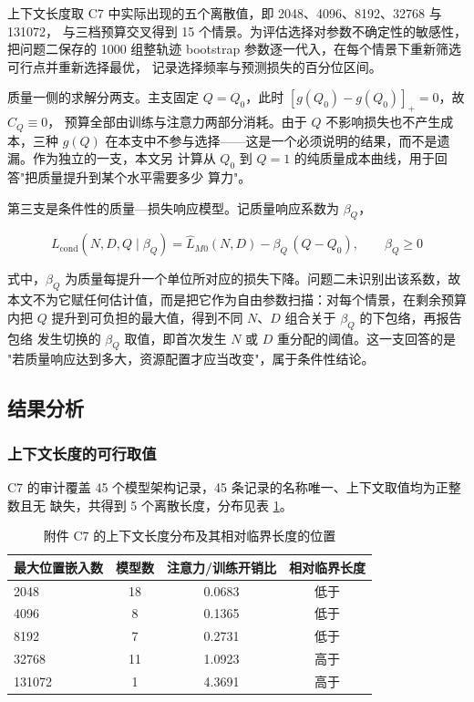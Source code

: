 \documentclass[bwprint]{gmcmthesis}
\numberwithin{equation}{section}
\numberwithin{figure}{section}
\numberwithin{table}{section}
\begin{document}
上下文长度取 C7 中实际出现的五个离散值，即 2048、4096、8192、32768 与 131072，
与三档预算交叉得到 15 个情景。为评估选择对参数不确定性的敏感性，把问题二保存的
1000 组整轨迹 bootstrap 参数逐一代入，在每个情景下重新筛选可行点并重新选择最优，
记录选择频率与预测损失的百分位区间。

质量一侧的求解分两支。主支固定 $Q=Q_0$，此时 $[g(Q_0)-g(Q_0)]_+=0$，故 $C_Q\equiv0$，
预算全部由训练与注意力两部分消耗。由于 $Q$ 不影响损失也不产生成本，三种 $g(Q)$
在本支中不参与选择——这是一个必须说明的结果，而不是遗漏。作为独立的一支，本文另
计算从 $Q_0$ 到 $Q=1$ 的纯质量成本曲线，用于回答"把质量提升到某个水平需要多少
算力"。

第三支是条件性的质量—损失响应模型。记质量响应系数为 $\beta_Q$，

\begin{equation}
L_{\mathrm{cond}}(N,D,Q\mid\beta_Q)=\hat L_{M0}(N,D)-\beta_Q\,(Q-Q_0),\qquad \beta_Q\ge0
\end{equation}

式中，$\beta_Q$ 为质量每提升一个单位所对应的损失下降。问题二未识别出该系数，故
本文不为它赋任何估计值，而是把它作为自由参数扫描：对每个情景，在剩余预算内把 $Q$
提升到可负担的最大值，得到不同 $N$、$D$ 组合关于 $\beta_Q$ 的下包络，再报告包络
发生切换的 $\beta_Q$ 取值，即首次发生 $N$ 或 $D$ 重分配的阈值。这一支回答的是
"若质量响应达到多大，资源配置才应当改变"，属于条件性结论。

\subsection{结果分析}

\subsubsection{上下文长度的可行取值}

C7 的审计覆盖 45 个模型架构记录，45 条记录的名称唯一、上下文取值均为正整数且无
缺失，共得到 5 个离散长度，分布见表 \ref{tab:q3-c7}。

\begin{table}[htp!]
\centering
\renewcommand\arraystretch{1.2}
\caption{附件 C7 的上下文长度分布及其相对临界长度的位置}\label{tab:q3-c7}
\begin{tabular*}{\textwidth}{@{\extracolsep{\fill}}lccc@{}}
\toprule
最大位置嵌入数 & 模型数 & 注意力/训练开销比 & 相对临界长度 \\
\midrule
2048   & 18 & 0.0683 & 低于 \\
4096   & 8  & 0.1365 & 低于 \\
8192   & 7  & 0.2731 & 低于 \\
32768  & 11 & 1.0923 & 高于 \\
131072 & 1  & 4.3691 & 高于 \\
\bottomrule
\end{tabular*}
\end{table}
\end{document}
